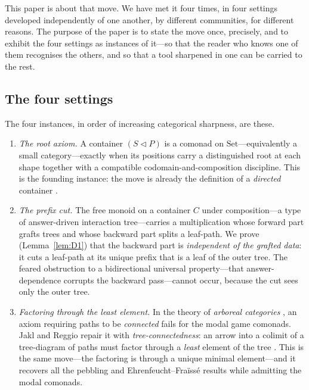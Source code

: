 \documentclass[11pt,reqno]{amsart}
\theoremstyle{plain}
\theoremstyle{definition}
\newcommand{\Set}{\mathrm{Set}}
\begin{document}
This paper is about that move. We have met it four times, in four settings developed independently of
one another, by different communities, for different reasons. The purpose of the paper is to state the
move once, precisely, and to exhibit the four settings as instances of it---so that the reader who
knows one of them recognises the others, and so that a tool sharpened in one can be carried to the
rest.

\subsection*{The four settings}
The four instances, in order of increasing categorical sharpness, are these.

\begin{enumerate}
\item[(I)] \emph{The root axiom.} A container $(S \triangleleft P)$ is a comonad on $\Set$---equivalently
a small category---exactly when its positions carry a distinguished root at each shape together with a
compatible codomain-and-composition discipline. This is the founding instance: the move is already the
definition of a \emph{directed} container \cite{AhmanChapmanUustalu2014,AhmanUustalu2016}.

\item[(II)] \emph{The prefix cut.} The free monoid on a container $C$ under composition---a type of
answer-driven interaction tree---carries a multiplication whose forward part grafts trees and whose
backward part splits a leaf-path. We prove (Lemma~\ref{lem:D1}) that the backward part is
\emph{independent of the grafted data}: it cuts a leaf-path at its unique prefix that is a leaf of the
outer tree. The feared obstruction to a bidirectional universal property---that answer-dependence
corrupts the backward pass---cannot occur, because the cut sees only the outer tree.

\item[(III)] \emph{Factoring through the least element.} In the theory of \emph{arboreal categories}
\cite{AbramskyShah2021,JaklReggio2026}, an axiom requiring paths to be \emph{connected} fails for the
modal game comonads. Jakl and Reggio repair it with \emph{tree-connectedness}: an arrow into a colimit
of a tree-diagram of paths must factor through a \emph{least} element of the tree
\cite[Def.~11]{JaklReggio2026}. This is the same move---the factoring is through a unique minimal
element---and it recovers all the pebbling and Ehrenfeucht--Fra\"iss\'e results while admitting the
modal comonads.


\end{enumerate}
\end{document}
